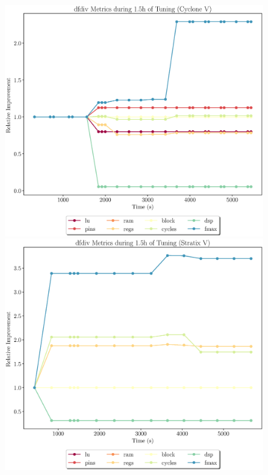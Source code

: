 \documentclass[12pt, a4paper]{article}
\begin{document}
\begin{figure}[htpb]
    \begin{minipage}{.48\textwidth}
        \includegraphics[scale=.25]{dfdiv_all_5400_chstone_CycloneV}
    \end{minipage}%
    \hfill
    \begin{minipage}{.48\textwidth}
        \includegraphics[scale=.25]{dfdiv_all_5400_chstone_StratixV}
    \end{minipage}%
\end{figure}
\end{document}
